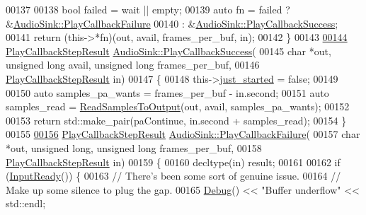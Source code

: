 \begin{DoxyCode}
00137 
00138     \textcolor{keywordtype}{bool} failed = wait || empty;
00139     \textcolor{keyword}{auto} fn = failed ? &\hyperlink{classAudioSink_a6e1b9254b242231ba8168e5e27d602ff}{AudioSink::PlayCallbackFailure}
00140                      : &\hyperlink{classAudioSink_a2194fd0629b52c550c9eb326f8ae10cc}{AudioSink::PlayCallbackSuccess};
00141     \textcolor{keywordflow}{return} (this->*fn)(out, avail, frames\_per\_buf, in);
00142 \}
00143 
\hypertarget{audio__sink_8cpp_source_l00144}{}\hyperlink{classAudioSink_a2194fd0629b52c550c9eb326f8ae10cc}{00144} \hyperlink{classAudioSink_a73002cc57611ac384c4e9d419e706e50}{PlayCallbackStepResult} \hyperlink{classAudioSink_a2194fd0629b52c550c9eb326f8ae10cc}{AudioSink::PlayCallbackSuccess}(
00145                 \textcolor{keywordtype}{char} *out, \textcolor{keywordtype}{unsigned} \textcolor{keywordtype}{long} avail, \textcolor{keywordtype}{unsigned} \textcolor{keywordtype}{long} frames\_per\_buf,
00146                 \hyperlink{classAudioSink_a73002cc57611ac384c4e9d419e706e50}{PlayCallbackStepResult} in)
00147 \{
00148     this->\hyperlink{classAudioSink_a00cbaaf2b4fcf5d9acb614b909234196}{just\_started} = \textcolor{keyword}{false};
00149 
00150     \textcolor{keyword}{auto} samples\_pa\_wants = frames\_per\_buf - in.second;
00151     \textcolor{keyword}{auto} samples\_read = \hyperlink{classAudioSink_a00ed918435d6f65b9533869453d5ae56}{ReadSamplesToOutput}(out, avail, samples\_pa\_wants);
00152 
00153     \textcolor{keywordflow}{return} std::make\_pair(paContinue, in.second + samples\_read);
00154 \}
00155 
\hypertarget{audio__sink_8cpp_source_l00156}{}\hyperlink{classAudioSink_a6e1b9254b242231ba8168e5e27d602ff}{00156} \hyperlink{classAudioSink_a73002cc57611ac384c4e9d419e706e50}{PlayCallbackStepResult} \hyperlink{classAudioSink_a6e1b9254b242231ba8168e5e27d602ff}{AudioSink::PlayCallbackFailure}(
00157                 \textcolor{keywordtype}{char} *out, \textcolor{keywordtype}{unsigned} \textcolor{keywordtype}{long}, \textcolor{keywordtype}{unsigned} \textcolor{keywordtype}{long} frames\_per\_buf,
00158                 \hyperlink{classAudioSink_a73002cc57611ac384c4e9d419e706e50}{PlayCallbackStepResult} in)
00159 \{
00160     decltype(in) result;
00161 
00162     \textcolor{keywordflow}{if} (\hyperlink{classAudioSink_a9b3dbe861acd4bb7ac1903730a0a01f3}{InputReady}()) \{
00163         \textcolor{comment}{// There's been some sort of genuine issue.}
00164         \textcolor{comment}{// Make up some silence to plug the gap.}
00165         \hyperlink{classDebug}{Debug}() << \textcolor{stringliteral}{"Buffer underflow"} << std::endl;

\end{DoxyCode}
